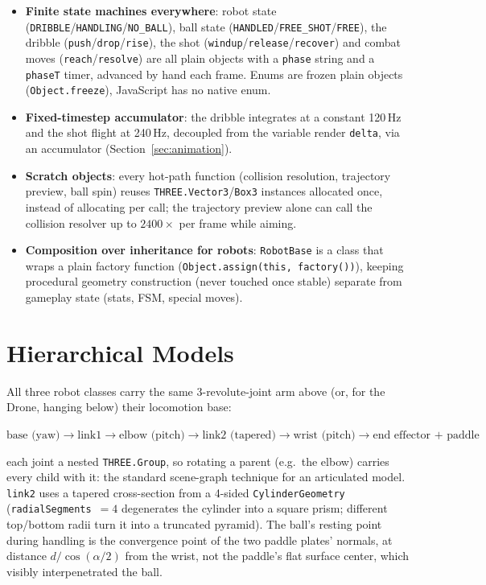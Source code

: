 \documentclass[11pt,a4paper]{article}
\newcommand{\code}[1]{\texttt{#1}}
\begin{document}
\begin{itemize}[nosep]
    \item \textbf{Finite state machines everywhere}: robot state (\code{DRIBBLE}/\code{HANDLING}/\code{NO\_BALL}), ball state (\code{HANDLED}/\code{FREE\_SHOT}/\code{FREE}), the dribble (\code{push}/\code{drop}/\code{rise}), the shot (\code{windup}/\code{release}/\code{recover}) and combat moves (\code{reach}/\code{resolve}) are all plain objects with a \code{phase} string and a \code{phaseT} timer, advanced by hand each frame. Enums are frozen plain objects (\code{Object.freeze}), JavaScript has no native enum.
    \item \textbf{Fixed-timestep accumulator}: the dribble integrates at a constant 120\,Hz and the shot flight at 240\,Hz, decoupled from the variable render \code{delta}, via an accumulator (Section~\ref{sec:animation}).
    \item \textbf{Scratch objects}: every hot-path function (collision resolution, trajectory preview, ball spin) reuses \code{THREE.Vector3}/\code{Box3} instances allocated once, instead of allocating per call; the trajectory preview alone can call the collision resolver up to $2400\times$ per frame while aiming.
    \item \textbf{Composition over inheritance for robots}: \code{RobotBase} is a class that wraps a plain factory function (\code{Object.assign(this, factory())}), keeping procedural geometry construction (never touched once stable) separate from gameplay state (stats, FSM, special moves).
\end{itemize}

\section{Hierarchical Models}
\label{sec:models}

All three robot classes carry the same 3-revolute-joint arm above (or, for the Drone, hanging below) their locomotion base:
\begin{center}
\small
$\text{base (yaw)} \rightarrow \text{link1} \rightarrow \text{elbow (pitch)} \rightarrow \text{link2 (tapered)} \rightarrow \text{wrist (pitch)} \rightarrow \text{end effector + paddle}$
\end{center}
each joint a nested \code{THREE.Group}, so rotating a parent (e.g.\ the elbow) carries every child with it: the standard scene-graph technique for an articulated model. \code{link2} uses a tapered cross-section from a 4-sided \code{CylinderGeometry} (\code{radialSegments}~$=4$ degenerates the cylinder into a square prism; different top/bottom radii turn it into a truncated pyramid). The ball's resting point during handling is the convergence point of the two paddle plates' normals, at distance $d / \cos(\alpha/2)$ from the wrist, not the paddle's flat surface center, which visibly interpenetrated the ball.
\end{document}
